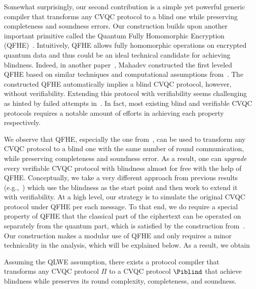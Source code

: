 Somewhat surprisingly, our second contribution is a simple yet powerful generic compiler that transforms any CVQC protocol to a blind one while preserving completeness and soundness errors.
Our construction builds upon another important primitive called the Quantum Fully Homomorphic Encryption (QFHE)~\cite{BJ15, DSS16, LC18, NS18, OTF18, mahadev_qfhe}.
Intuitively, QFHE allows fully homomorphic operations on encrypted quantum data and thus could be an ideal technical candidate for achieving blindness.
Indeed, in another paper~\cite{mahadev_qfhe}, Mahadev constructed the first leveled QFHE based on similar techniques and computational assumptions from~\cite{FOCS:Mahadev18a}. 
The constructed QFHE automatically implies a blind CVQC protocol, however, without verifiability. 
Extending this protocol with verifiability seems challenging as hinted by failed attempts in~\cite{mahadev_2018}.
In fact, most existing blind and verifiable CVQC protocols requires a notable amount of efforts in achieving each property respectively. 

We observe that QFHE, especially the one from~\cite{mahadev_qfhe}, can be used to transform any CVQC protocol to a blind one with the same number of round communication, while preserving completeness and soundness error. 
As a result, one can \emph{upgrade} every verifiable CVQC protocol with blindness almost for free with the help of QFHE. 
Conceptually, we take a very different approach from previous results (e.g.,~\cite{FK17}) which use the blindness as the start point and then work to extend it with verifiability. 
At a high level, our strategy is to simulate the original CVQC protocol under QFHE per each message. 
To that end, we do require a special property of QFHE that the classical part of the ciphertext can be operated on separately from the quantum part, which is satisfied by the construction from~\cite{mahadev_qfhe}.
Our construction makes a modular use of QFHE and only requires a minor technicality in the analysis, which will be explained below. As a result, we obtain
\begin{theorem}[informal]
Assuming the QLWE assumption, there exists a protocol compiler that transforms any CVQC protocol $\Pi$ to a CVQC protocol $\Piblind$ that achieve blindness while preserves its round complexity, completeness, and soundness.
\end{theorem}




